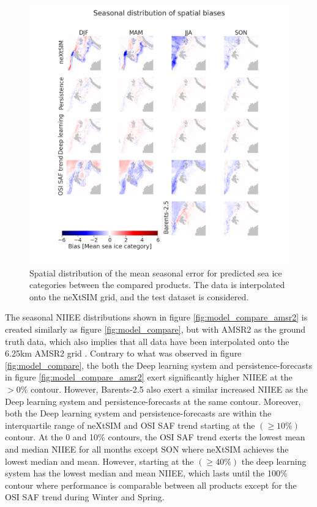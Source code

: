 \documentclass[../main/thesis.tex]{subfiles}
\begin{document}
\begin{figure}
    \centering
    \includegraphics[width=\textwidth]{anomalies}
    \caption{\label{fig:anomalies}Spatial distribution of the mean seasonal error for predicted sea ice categories between the compared products. The data is interpolated onto the neXtSIM grid, and the test dataset is considered.}
\end{figure}


The seasonal NIIEE distributions shown in figure \ref{fig:model_compare_amsr2} is created similarly as figure \ref{fig:model_compare}, but with AMSR2 as the ground truth data, which also implies that all data have been interpolated onto the 6.25km AMSR2 grid \citep{Spreen2008}. Contrary to what was observed in figure \ref{fig:model_compare}, the both the Deep learning system and persistence-forecasts in figure \ref{fig:model_compare_amsr2} exert significantly higher NIIEE at the $>0\%$ contour. However, Barents-2.5 also exert a similar increased NIIEE as the Deep learning system and persistence-forecasts at the same contour. Moreover, both the Deep learning system and persistence-forecasts are within the interquartile range of neXtSIM and OSI SAF trend starting at the $(\geq10\%)$ contour. At the 0 and 10\% contours, the OSI SAF trend exerts the lowest mean and median NIIEE for all months except SON where neXtSIM achieves the lowest median and mean. However, starting at the $(\geq40\%)$ the deep learning system has the lowest median and mean NIIEE, which lasts until the 100\% contour where performance is comparable between all products except for the OSI SAF trend during Winter and Spring.
\end{document}

